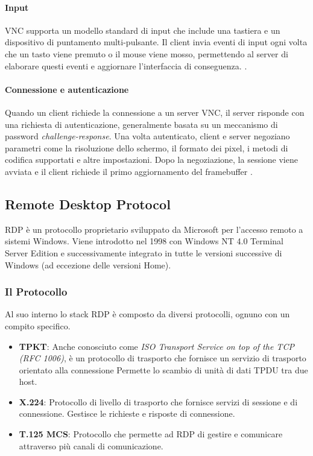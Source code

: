 \documentclass[12pt,a4paper,openright,twoside]{book}
\begin{document}
\paragraph{Input}

\ac{VNC} supporta un modello standard di input che include una tastiera e un dispositivo di puntamento multi-pulsante.
Il client invia eventi di input ogni volta che un tasto viene premuto o il mouse viene mosso, permettendo al server di elaborare questi eventi e aggiornare l'interfaccia di conseguenza. \cite{richardson1998vnc}.

\paragraph{Connessione e autenticazione}

Quando un client richiede la connessione a un server \ac{VNC},
il server risponde con una richiesta di autenticazione,
generalmente basata su un meccanismo di password \textit{challenge-response}.
%
Una volta autenticato, client e server negoziano parametri come la risoluzione dello schermo,
il formato dei pixel, i metodi di codifica supportati e altre impostazioni.
%
Dopo la negoziazione, la sessione viene avviata e il client richiede il primo aggiornamento del framebuffer \cite{richardson1998vnc}.

\subsection{Remote Desktop Protocol}
\label{sec:rdp}
\ac{RDP} è un protocollo proprietario sviluppato da Microsoft per l'accesso remoto a sistemi Windows.
Viene introdotto nel 1998 con Windows NT 4.0 Terminal Server Edition e successivamente integrato in tutte le versioni successive di Windows (ad eccezione delle versioni Home).

\subsubsection{Il Protocollo}
Al suo interno lo stack \ac{RDP} è composto da diversi protocolli, ognuno con un compito specifico.
\begin{itemize}
    \item \textbf{TPKT}: Anche conosciuto come \emph{ISO Transport Service on top of the TCP (RFC 1006)}, è un protocollo di trasporto che fornisce un servizio di trasporto orientato alla connessione
     Permette lo scambio di unità di dati \ac{TPDU} tra due host.
    \item \textbf{X.224}: Protocollo di livello di trasporto che fornisce servizi di sessione e di connessione. Gestisce le richieste e risposte di connessione.
    \item \textbf{T.125 MCS}: Protocollo che permette ad \ac{RDP} di gestire e comunicare attraverso più canali di comunicazione.
\end{itemize}
\end{document}
